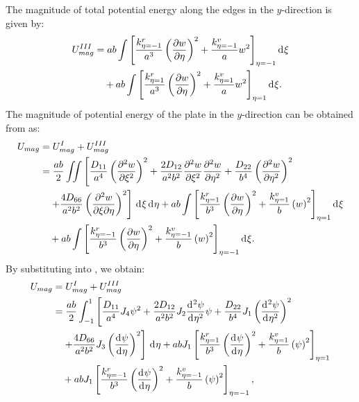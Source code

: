 \documentclass[preprint,12pt]{elsarticle}
\newcommand{\id}{\mathrm{d}\mkern1mu}
\begin{document}
The magnitude of total potential energy along the edges in the \( y \)-direction is given by:  
%
\begin{equation}\label{eq:poten_energy_edgey2}  
	\begin{split}  
		U^{III}_{mag} &= ab \int \left[ \frac{k^r_{\eta=-1}}{a^3} \left( \frac{\partial w}{\partial \eta} \right)^2 + \frac{k^v_{\eta=-1}}{a} w^2 \right]_{\eta=-1} \id \xi \\  
		&\quad + ab \int \left[ \frac{k^r_{\eta=1}}{a^3} \left( \frac{\partial w}{\partial \eta} \right)^2 + \frac{k^v_{\eta=1}}{a} w^2 \right]_{\eta=1} \id \xi.  
	\end{split}  
\end{equation} 
% 
The magnitude of potential energy of the plate in the \(y\)-direction can be obtained from
 as:
%
\begin{equation}\label{eq:poten_energy_toly}
	\begin{split}
		U_{mag}&=U^{I}_{mag}+U^{III}_{mag}\\
		&=\frac{ab}{2} \iint \left[ \frac{D_{11}}{a^4} \left( \frac{\partial^2 w}{\partial \xi^2} \right)^2 + \frac{2 D_{12}}{a^2 b^2} \frac{\partial^2 w}{\partial \xi^2} \frac{\partial^2 w}{\partial \eta^2} + \frac{D_{22}}{b^4} \left( \frac{\partial^2 w}{\partial \eta^2} \right)^2 \right. \\
		&\quad \left.  + \frac{4 D_{66}}{a^2 b^2}\left( \frac{\partial^2 w}{\partial \xi \partial \eta} \right)^2 \right] \, \id\xi \, \id\eta+ab \int \left[ \frac{k^r_{\eta=1}}{b^3} \left( \frac{\partial w}{\partial \eta} \right)^2 + \frac{k^v_{\eta=1}}{b} \left( w \right)^2 \right]_{\eta=1} \id\xi\\
		&\quad+ab \int \left[ \frac{k^r_{\eta=-1}}{b^3} \left( \frac{\partial w}{\partial \eta} \right)^2 + \frac{k^v_{\eta=-1}}{b} \left( w \right)^2 \right]_{\eta=-1} \id\xi.
	\end{split}
\end{equation}
%
By substituting  into , we obtain:  
%
\begin{equation}\label{eq:poten_energy_toly2}
	\begin{split}
		U_{mag} &= U^{I}_{mag} + U^{III}_{mag} \\
		&= \frac{ab}{2} \int_{-1}^{1} \left[ \frac{D_{11}}{a^4} J_4 \psi^2 
		+ \frac{2D_{12}}{a^2b^2} J_2 \frac{\id^2\psi }{\id \eta^2} \psi 
		+ \frac{D_{22}}{b^4} J_1 \left(\frac{\id^2\psi }{\id \eta^2} \right)^2 \right. \\
		&\quad \left. + \frac{4D_{66}}{a^2b^2} J_3 \left(\frac{\id \psi }{\id \eta} \right)^2 \right] \, \id\eta  + abJ_1 \left[ \frac{k^r_{\eta=1}}{b^3} \left( \frac{\id \psi}{\id \eta} \right)^2
		+ \frac{k^v_{\eta=1}}{b}  \left(\psi\right)^2 \right]_{\eta=1} \\
		&\quad + abJ_1 \left[ \frac{k^r_{\eta=-1}}{b^3} \left( \frac{\id \psi}{\id \eta} \right)^2
		+ \frac{k^v_{\eta=-1}}{b} \left(\psi\right)^2 \right]_{\eta=-1},
	\end{split}
\end{equation}
\end{document}

